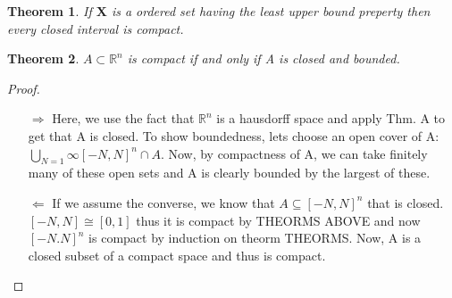 \documentclass[a4paper, 12pt]{article}
\newcommand{\RR}{\mathbb{R}}
\newcommand{\XX}{\mathbf{X}}
\newtheorem{theorm}{Theorem}
\begin{document}
\begin{theorm}
        If $\XX$ is a ordered set having the least upper bound preperty then every closed interval is compact.
\end{theorm}

\begin{theorm}
        $A \subset \RR^n$ is compact if and only if A is closed and bounded.
\end{theorm}
\begin{proof}~
        \begin{enumerate}
                \item[$\Rightarrow$] Here, we use the fact that $\RR^n$ is a hausdorff space and apply Thm. A to get that A is closed. To show boundedness, lets choose an open cover of A: $\bigcup\limits_{N=1}{\infty} [-N,N]^n \cap A$. Now, by compactness of A, we can take finitely many of these open sets and A is clearly bounded by the largest of these.
                \item[$\Leftarrow$] If we assume the converse, we know that $A \subseteq [-N, N]^n$ that is closed. $[-N, N] \cong [0,1]$ thus it is compact by THEORMS ABOVE and now $[-N. N]^n$ is compact by induction on theorm THEORMS. Now, A is a closed subset of a compact space and thus is compact.
        \end{enumerate}
\end{proof}
    
\end{document}
